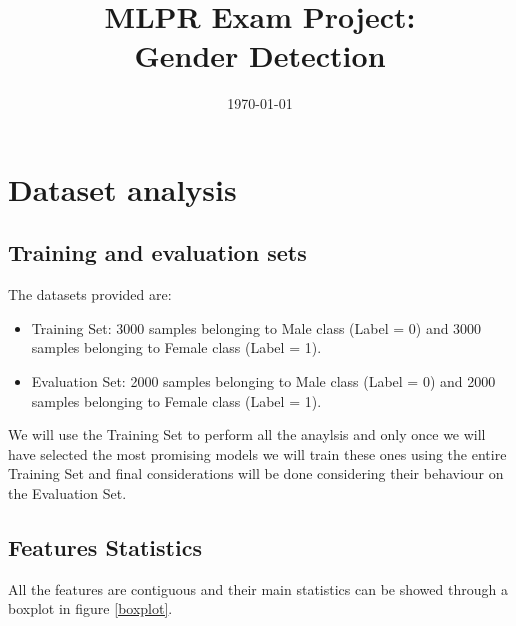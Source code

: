 \documentclass[10pt, a4paper, twocolumn]{article} %
\title{MLPR Exam Project: \\Gender Detection} %
\author{
	\authorstyle{Mattia Rosso [s294711]} %
}
\date{\today} %
\begin{document}
\maketitle %
\thispagestyle{firstpage} %




\section{Dataset analysis}
\subsection{Training and evaluation sets}
The datasets provided are:
\begin{itemize}
	\item Training Set: 3000 samples belonging to Male class (Label = 0) and
						3000 samples belonging to Female class (Label = 1).
	\item Evaluation Set: 2000 samples belonging to Male class (Label = 0) and
						  2000 samples belonging to Female class (Label = 1).
\end{itemize}
We will use the Training Set to perform all the anaylsis and only
once we will have selected the most promising models we will train these ones using the 
entire Training Set and final considerations will be done considering their 
behaviour on the Evaluation Set.
\subsection{Features Statistics}
All the features are contiguous and their main statistics can be
showed through a boxplot in figure \ref{boxplot}. 
\end{document}
